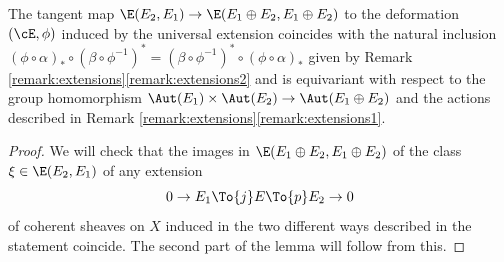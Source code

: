 \begin{lemma}\label{lemma:extensions-deformations}
The tangent map $\E(E_2,E_1)\to \E( E_1\oplus E_2, E_1\oplus E_2)$ to the deformation $(\cE,\phi)$ induced by the universal extension coincides with the natural inclusion $(\phi\circ \alpha)_*\circ (\beta\circ\phi^{-1})^*=(\beta\circ\phi^{-1})^*\circ(\phi\circ \alpha)_*$ given by Remark \ref{remark:extensions}\eqref{remark:extensions2} and is equivariant with respect to the group homomorphism $\Aut(E_1)\times\Aut(E_2)\to\Aut(E_1\oplus E_2)$ and the actions described in Remark \ref{remark:extensions}\eqref{remark:extensions1}.
\end{lemma}
\begin{proof}
We will check that the images in $\E( E_1\oplus E_2, E_1\oplus E_2)$ of the class $\xi\in\E(E_2,E_1)$ of any extension
\begin{equation}
\label{equation:xi}
0\to E_{1}\To{j} E\To{p} E_{2}\to 0
\end{equation}
of coherent sheaves on $X$ induced in the two different ways described in the statement coincide. The second part of the lemma will follow from this.


\end{proof}

